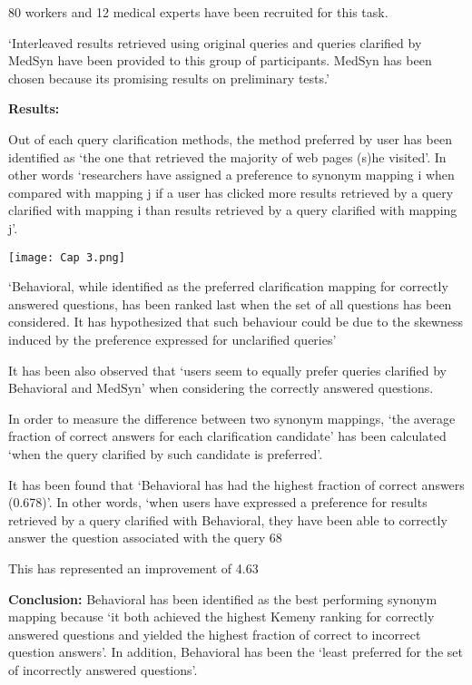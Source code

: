 \documentclass[]{article}
\begin{document}
80 workers and 12 medical experts have been recruited for this task.

‘Interleaved results retrieved using original queries and queries clarified by MedSyn have been provided to this group of participants. MedSyn has been chosen because its promising results on preliminary tests.’


\textbf{Results:}

Out of each query clarification methods, the method preferred by user has been identified as ‘the one that retrieved the majority of web pages (s)he visited’. In other words ‘researchers have assigned a preference to synonym mapping i when compared with mapping j if a user has clicked more results retrieved by a query clarified with mapping i than results retrieved by a query clarified with mapping j’. 

\texttt{[image: Cap 3.png]}

‘Behavioral, while identified as the preferred clarification mapping for correctly answered questions, has been ranked last when the set of all questions has been considered. It has hypothesized that such behaviour could be due to the skewness induced by the preference expressed for unclarified queries’

It has been also observed that ‘users seem to equally prefer queries clarified by Behavioral and MedSyn’ when considering the correctly answered questions. 

In order to measure the difference between two synonym mappings, ‘the average fraction of correct answers for each clarification candidate’ has been calculated ‘when the query clarified by such candidate is preferred’. 

It has been found that ‘Behavioral has had the highest fraction of correct answers (0.678)’. In other words, ‘when users have expressed a preference for results retrieved by a query clarified with Behavioral, they have been able to correctly answer the question associated with the query 68 %

This has represented an improvement of 4.63 %

\textbf{Conclusion:} Behavioral has been identified as the best performing synonym mapping because ‘it both achieved the highest Kemeny ranking for correctly answered questions and yielded the highest fraction of correct to incorrect question answers’. In addition, Behavioral has been the ‘least preferred for the set of incorrectly answered questions’.
\end{document}
